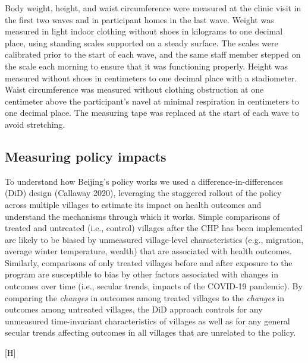 \documentclass[
  letterpaper,
  DIV=11,
  numbers=noendperiod]{scrartcl}
\makeatletter
\renewenvironment{figure}%
   {\renewcommand\familydefault\sfdefault
    \@float{figure}}
   {\end@float}
\makeatother
\begin{document}
Body weight, height, and waist circumference were measured at the clinic
visit in the first two waves and in participant homes in the last wave.
Weight was measured in light indoor clothing without shoes in kilograms
to one decimal place, using standing scales supported on a steady
surface. The scales were calibrated prior to the start of each wave, and
the same staff member stepped on the scale each morning to ensure that
it was functioning properly. Height was measured without shoes in
centimeters to one decimal place with a stadiometer. Waist circumference
was measured without clothing obstruction at one centimeter above the
participant's navel at minimal respiration in centimeters to one decimal
place. The measuring tape was replaced at the start of each wave to
avoid stretching.

\subsection{Measuring policy impacts}\label{measuring-policy-impacts}

To understand how Beijing's policy works we used a
difference-in-differences (DiD) design (Callaway 2020), leveraging the
staggered rollout of the policy across multiple villages to estimate its
impact on health outcomes and understand the mechanisms through which it
works. Simple comparisons of treated and untreated (i.e., control)
villages after the CHP has been implemented are likely to be biased by
unmeasured village-level characteristics (e.g., migration, average
winter temperature, wealth) that are associated with health outcomes.
Similarly, comparisons of only treated villages before and after
exposure to the program are susceptible to bias by other factors
associated with changes in outcomes over time (i.e., secular trends,
impacts of the COVID-19 pandemic). By comparing the \emph{changes} in
outcomes among treated villages to the \emph{changes} in outcomes among
untreated villages, the DiD approach controls for any unmeasured
time-invariant characteristics of villages as well as for any general
secular trends affecting outcomes in all villages that are unrelated to
the policy.

\begin{figure}[H]


\caption{\label{fig-didfig}Stylized example of
difference-in-differences}

\end{figure}%
\end{document}

